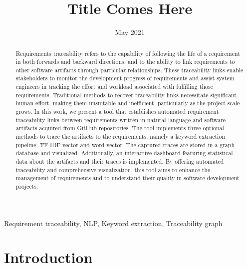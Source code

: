 \documentclass[conference]{IEEEtran}
\begin{document}
\title{Title Comes Here }
\author{
}

\date{May 2021}

\maketitle
\begin{abstract}
    Requirements traceability refers to the capability of following the life of a requirement in both forwards and backward directions, and to the ability to link requirements to other software artifacts through particular relationships. These traceability links enable stakeholders to monitor the development progress of requirements and assist system engineers in tracking the effort and workload associated with fulfilling those requirements. Traditional methods to recover traceability links necessitate significant human effort, making them unsuitable and inefficient, particularly as the project scale grows. In this work, we present a tool that establishes automated requirement traceability links between requirements written in natural language and software artifacts acquired from GitHub repositories. The tool implements three optional methods to trace the artifacts to the requirements, namely a keyword extraction pipeline, TF-IDF vector and word-vector. The captured traces are stored in a graph database and visualized. Additionally, an interactive dashboard featuring statistical data about the artifacts and their traces is implemented. By offering automated traceability and comprehensive visualization, this tool aims to enhance the management of requirements and to understand their quality in software development projects.
\end{abstract}
\begin{IEEEkeywords}
Requirement traceability, NLP, Keyword extraction, Traceability graph
\end{IEEEkeywords}

\section{Introduction} \label{section:introduction}

\end{document}
